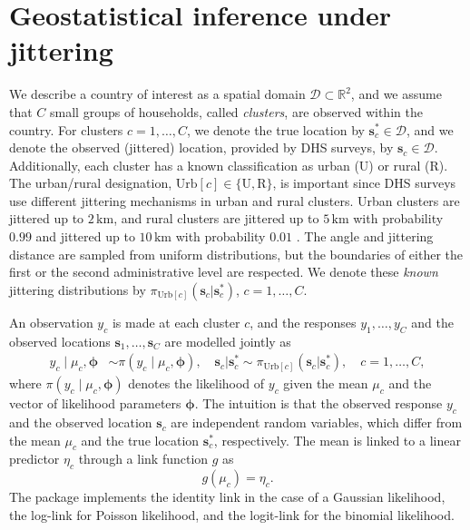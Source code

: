 \section{Geostatistical inference under jittering}
\label{sec:method}
We describe a country of interest as a spatial domain $\mathcal{D}\subset\mathbb{R}^2$, and we assume that $C$ small groups of households, called \emph{clusters}, are observed within the country. For clusters $c = 1, \ldots, C$, we denote the true location by $\boldsymbol{s}_c^* \in\mathcal{D}$, and we denote the observed (jittered) location, provided by DHS surveys, by $\boldsymbol{s}_c \in\mathcal{D}$. Additionally, each cluster has a known classification as urban (U) or rural (R). The urban/rural designation, $\mathrm{Urb}[c]\in\{\mathrm{U},\mathrm{R}\}$, is important since DHS surveys use different jittering mechanisms in urban and rural clusters.
Urban clusters are jittered up to $2\, \mathrm{km}$, and rural clusters are jittered up to $5\, \mathrm{km}$ with probability $0.99$ and jittered up to $10\, \mathrm{km}$ with probability $0.01$ \citep{DHSspatial07}. The angle and jittering distance are sampled from uniform distributions, but the boundaries of either the first or the second administrative level are respected. We denote these \emph{known} jittering distributions by $\pi_{\mathrm{Urb}[c]}(\boldsymbol{s}_c|\boldsymbol{s}_c^*)$, $c = 1, \ldots, C$.

An observation $y_c$ is made at each cluster $c$, and the responses $y_1, \ldots, y_C$ and the observed locations $\boldsymbol{s}_1, \ldots, \boldsymbol{s}_C$ are modelled jointly as
\begin{align}
y_c \mid \mu_c, \boldsymbol{\phi} &\sim \pi(y_c \mid \mu_c, \boldsymbol{\phi}),  \quad \boldsymbol{s}_c|\boldsymbol{s}_c^*\sim \pi_{\mathrm{Urb}[c]}(\boldsymbol{s}_c|\boldsymbol{s}_c^*), \quad c  = 1, \ldots, C, \label{eq:model}
\end{align}
where  $\pi(y_c \mid \mu_c, \boldsymbol{\phi})$ denotes the likelihood of $y_c$ given the mean $\mu_c$ and the vector of likelihood parameters $\boldsymbol{\phi}$. The intuition is that the observed response $y_c$ and the observed location $\boldsymbol{s}_c$ are independent random variables, which differ from the mean $\mu_c$ and the true location $\boldsymbol{s}_c^*$, respectively.  The mean is linked to a linear predictor $\eta_c$ through a link function $g$ as
\[
    g(\mu_c) = \eta_c.
\]
The package implements the identity link in the case of a Gaussian likelihood, the log-link for Poisson likelihood, and the logit-link for the binomial likelihood. 

